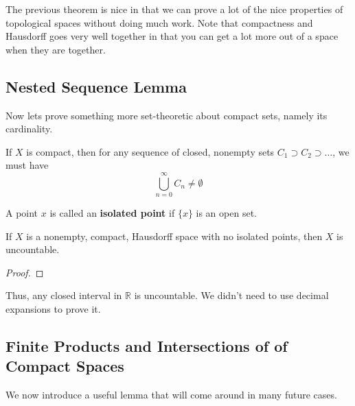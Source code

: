   The previous theorem is nice in that we can prove a lot of the nice properties of topological spaces without doing much work. Note that compactness and Hausdorff goes very well together in that you can get a lot more out of a space when they are together. 

\subsection{Nested Sequence Lemma}

  Now lets prove something more set-theoretic about compact sets, namely its cardinality. 

  \begin{lemma}
    If $X$ is compact, then for any sequence of closed, nonempty sets $C_1 \supset C_2 \supset \ldots$, we must have 
    \begin{equation}
      \bigcup_{n=0}^{\infty} C_n \neq \emptyset
    \end{equation}
  \end{lemma}

  \begin{definition}
    A point $x$ is called an \textbf{isolated point} if $\{x\}$ is an open set. 
  \end{definition}

  \begin{theorem}
    If $X$ is a nonempty, compact, Hausdorff space with no isolated points, then $X$ is uncountable. 
  \end{theorem}
  \begin{proof}
    
  \end{proof}

  Thus, any closed interval in $\mathbb{R}$ is uncountable. We didn't need to use decimal expansions to prove it. 

\subsection{Finite Products and Intersections of of Compact Spaces}

  We now introduce a useful lemma that will come around in many future cases. 

